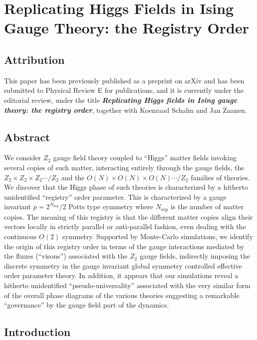 \chapter{Replicating Higgs Fields in Ising Gauge Theory: the Registry Order}
\label{ch:higgs}

\section*{Attribution}
This paper has been previously published as a preprint on arXiv and has been submitted to Physical Review E for publications, and it is currently under the editorial review, under the title \textbf{\textit{Replicating Higgs fields in Ising gauge theory: the registry order}}, together with Koenraad Schalm and Jan Zaanen.\cite{Bukva:Registry}

\section*{Abstract}
We consider $Z_2$ gauge field theory coupled to ``Higgs'' matter fields invoking several copies of such matter, interacting entirely through the gauge fields, the 
$Z_2 \times Z_2 \times Z_2\cdots / Z_2$ and the $O(N) \times O(N) \times O(N) \cdots / Z_2$ families of theories. We discover that the Higgs phase of such theories is characterized by a hitherto unidentified ``registry'' order parameter. This is characterized by a gauge invariant $p = 2^{N_{\text{rep}}}/2$  Potts type symmetry  where $N_{\text{rep}}$ is the number of matter copies. The meaning of this registry is that the different matter copies align their vectors locally in strictly parallel or anti-parallel fashion, even dealing with the continuous $O(2)$ symmetry.  Supported by Monte-Carlo simulations, we identify the origin of this registry order in terms of the gauge interactions mediated by the fluxes (``visons'') associated with the $Z_2$ gauge fields, indirectly imposing the discrete symmetry in the gauge invariant global symmetry controlled effective order parameter theory. In addition, it appears that our simulations reveal a hitherto unidentified ``pseudo-universality'' associated with the very similar form of the overall phase diagrams of the various theories suggesting a remarkable ``governance'' by the gauge field part of the dynamics.  

\section{Introduction}
\label{intro}

